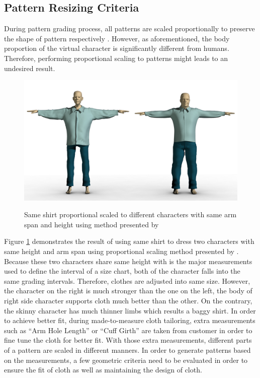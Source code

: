 \subsection{Pattern Resizing Criteria}

During pattern grading process, all patterns are scaled proportionally to preserve the shape of pattern respectively . However, as aforementioned, the body proportion of the virtual character is significantly different from humans. Therefore, performing proportional scaling to patterns might leads to an undesired result.  

\begin{figure}[H]
	\includegraphics[width=\columnwidth]{../images/sknny_fatty}\\[0.1cm]
    \caption[Same shirt on different characters]{Same shirt proportional scaled to different characters with same arm span and height using method presented by }
    \label{figure:fs_compare}
\end{figure}

Figure \ref{figure:fs_compare} demonstrates the result of using same shirt to dress two characters with same height and arm span using proportional scaling method presented by . Because these two characters share same height with is the major measurements used to define the interval of a size chart, both of the character falls into the same grading intervals. Therefore, clothes are adjusted into same size. However, the character on the right is much stronger than the one on the left, the body of right side character supports cloth much better than the other. On the contrary, the skinny character has much thinner limbs which results a baggy shirt. In order to achieve better fit, during made-to-measure cloth tailoring, extra measurements such as ``Arm Hole Length'' or ``Cuff Girth'' are taken from customer in order to fine tune the cloth for better fit. With those extra measurements, different parts of a pattern are scaled in different manners. In order to generate patterns based on the measurements, a few geometric criteria need to be evaluated in order to ensure the fit of cloth as well as maintaining the design of cloth. 

